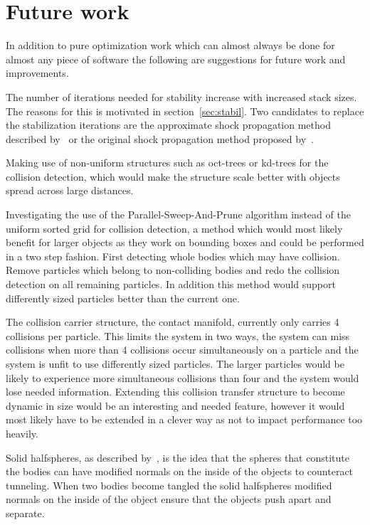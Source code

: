 \section{Future work}
In addition to pure optimization work which can almost always be done for almost any piece
of software the following are suggestions for future work and improvements.

The number of iterations needed for stability increase with increased stack sizes.
The reasons for this is motivated in section~\ref{sec:stabil}.
Two candidates to replace the stabilization iterations are
the approximate shock propagation method described by~\cite{flex} or the original
shock propagation method proposed by~\cite{guendelman}.

Making use of non-uniform structures such as oct-trees or kd-trees for the collision
detection, which would make the structure scale better with objects spread across
large distances.

Investigating the use of the Parallel-Sweep-And-Prune algorithm instead of the
uniform sorted grid for collision detection, a method which would most likely
benefit for larger objects as they work on bounding boxes and could be performed
in a two step fashion. First detecting whole bodies which may have collision.
Remove particles which belong to non-colliding bodies and redo the collision detection
on all remaining particles. In addition this method would support differently sized
particles better than the current one.

The collision carrier structure, the contact manifold, currently only carries
4 collisions per particle. This limits the system in two ways, the system can miss
collisions when more than 4 collisions occur simultaneously on a particle and the
system is unfit to use differently sized particles. The larger particles would
be likely to experience more simultaneous collisions than four and the system would
lose needed information. Extending this collision transfer structure to become dynamic
in size would be an interesting and needed feature, however it would most likely have
to be extended in a clever way as not to impact performance too heavily.

Solid halfspheres, as described by~\cite{flex}, is the idea that the spheres that
constitute the bodies can have modified normals on the inside of the objects to counteract
tunneling. When two bodies become tangled the solid halfspheres modified normals
on the inside of the object ensure that the objects push apart and separate.
